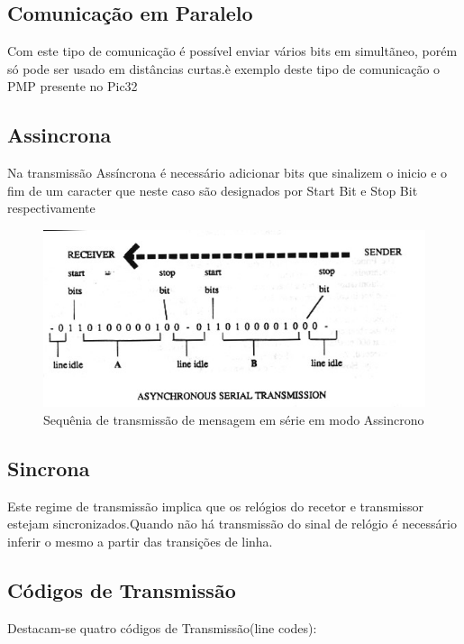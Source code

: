 \documentclass[10pt,a4paper]{paper}
\begin{document}
	\subsection*{Comunicação em Paralelo}
	
	Com este tipo de comunicação é possível enviar vários bits em simultãneo, porém só pode ser usado em distâncias curtas.è exemplo deste tipo de comunicação o PMP presente no Pic32
	
	\subsection*{Assincrona}
	
	Na transmissão Assíncrona  é necessário adicionar bits que sinalizem o inicio e o fim de um caracter	que neste caso são designados por Start Bit e Stop Bit respectivamente
	
	\begin{figure}[ht]
		\includegraphics[scale=0.5]{fig7.png}
		\centering
		\caption{Sequênia de transmissão de mensagem em série em modo Assincrono}
		\label{fig:figura7 }
	\end{figure}
	

	\subsection*{Sincrona}
	
Este regime de transmissão implica que os relógios do recetor e transmissor estejam sincronizados.Quando não há transmissão do sinal de relógio é necessário inferir o mesmo a partir das transições de linha.
	
	\subsection*{Códigos de Transmissão} 
	
	Destacam-se quatro códigos de Transmissão(line codes):
	
\end{document}
